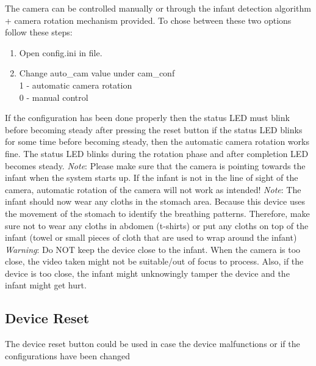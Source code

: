 \documentclass{article}
\begin{document}
The camera can be controlled manually or through the infant detection algorithm + camera rotation mechanism provided. To chose between these two options follow these steps:

\begin{enumerate}

  \item Open config.ini in file.
  \item Change auto\_cam value under cam\_conf \\
  1 - automatic camera rotation\\
  0 - manual control   %
  
\end{enumerate}

If the configuration has been done properly then the status LED must blink before becoming steady after pressing the reset button
if the status LED blinks for some time before becoming steady, then the automatic camera rotation works fine. The status LED blinks during the rotation phase and after completion LED becomes steady.
\newline
\newline
\emph{Note}: Please make sure that the camera is pointing towards the infant when the system starts up. If the infant is not in the line of sight of the camera, automatic rotation of the camera will not work as intended!
\newline
\newline
\emph{Note}: The infant should now wear any cloths in the stomach area. Because this device uses the movement of the stomach to identify the breathing patterns. Therefore, make sure not to wear any cloths in abdomen (t-shirts) or put any cloths on top of the infant (towel or small pieces of cloth that are used to wrap around the infant)
\newline
\newline
\emph{Warning}: Do NOT keep the device close to the infant. When the camera is too close, the video taken might not be suitable/out of focus to process. Also, if the device is too close, the infant might unknowingly tamper the device and the infant might get hurt.

\subsection{Device Reset}

The device reset button could be used in case the device malfunctions or if the configurations have been changed
\end{document}
